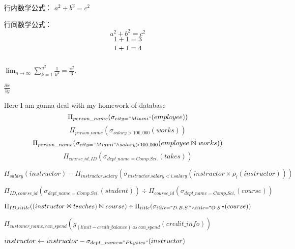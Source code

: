 \documentclass[a4paper]{ctexart}
\begin{document}
	
	行内数学公式： $a^2 + b^2 = c^2$\par
	行间数学公式：
	\begin{equation}
	a^2 + b^2 = c^2 \label{pythagorean}
	\end{equation}
	\begin{equation}
	1 + 1 = 3 \tag{666} %
	\end{equation}
	\begin{equation}
	1 + 1 = 4 \notag %
	\end{equation}\par
	\begin{equation*}
	\end{equation*}\par
	$\lim_{n\to\infty}
	\sum_{k=1}^{n^2} \frac{1}{k^2}
	= \frac{\pi^2}{6}$.\par
	$\frac{\partial{x}}{\partial{y}}$
	\par\par\par
	Here I am gonna deal with my homework of database
	\begin{equation*}
	\Pi_{person\_name}(\sigma_{city="Miami"}(employee))
	\end{equation*}
	\begin{equation*}
	\Pi_{person\_name}(\sigma_{salary>100,000}(works))
	\end{equation*}
	\begin{equation*}
	\Pi_{person\_name}(\sigma_{city="Miami"\land{}salary>100,000}(employee\Join_{}works))
	\end{equation*}
	\begin{equation*}
	\Pi_{course\_id,ID}(\sigma_{dept\_name=Comp.Sci.}(takes))
	\end{equation*}\par
	$\Pi_{salary}(instructor)-\Pi_{instructor.salary}(\sigma_{instructor.salary<i.salary}(instructor\times\rho_{i}(instructor)))$%
	\par
	$\Pi_{ID,course\_id}(\sigma_{dept\_name=Comp.Sci.}(student))\div{}\Pi_{course\_id}(\sigma_{dept\_name=Comp.Sci.}(course))$%
	\par
	$\Pi_{ID,titile}((instructor\Join{}teaches)\Join{}course)\div{}\Pi_{title}(\sigma_{title="D.B.S."\land{}title="O.S."}(course))$%
	\par
	$\Pi_{customer\_name,can\_spend}(g_{(limit-credit\_balance)\ {}as\ {}can\_spend}(credit\_info))$%
	\par
	$instructor\gets{}instructor-\sigma_{dept\_name="Physics"}(instructor)$%
\end{document}
